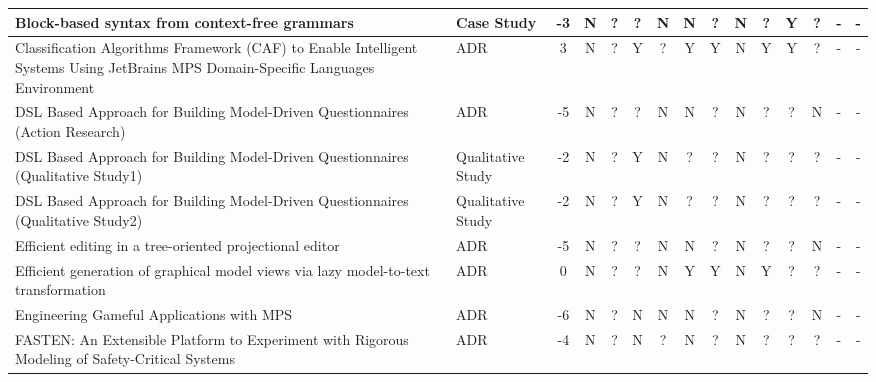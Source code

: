 \begin{landscape}
\begin{longtable}{ | p{11cm} | l | *{13}{c|} }
        Block-based syntax from context-free grammars\cite{addazi2021blended_SLR}                                                                                              & Case Study        &  -3   & N & ? & ? & N & N & ? & N & ? & Y & ?  & - & - \\\hline
        Classification Algorithms Framework (CAF) to Enable Intelligent Systems Using JetBrains MPS Domain-Specific Languages Environment\cite{meacham2020classification_SLR}  & ADR               &  3    & N & ? & Y & ? & Y & Y & N & Y & Y & ?  & - & - \\\hline
        DSL Based Approach for Building Model-Driven Questionnaires (Action Research)\cite{furtado2021dsl_SLR}                                                                 & ADR               &  -5   & N & ? & ? & N & N & ? & N & ? & ? & N  & - & - \\\hline
        DSL Based Approach for Building Model-Driven Questionnaires (Qualitative Study1)\cite{furtado2021dsl_SLR}                                                              & Qualitative Study &  -2   & N & ? & Y & N & ? & ? & N & ? & ? & ?  & - & - \\\hline
        DSL Based Approach for Building Model-Driven Questionnaires (Qualitative Study2)\cite{furtado2021dsl_SLR}                                                              & Qualitative Study &  -2   & N & ? & Y & N & ? & ? & N & ? & ? & ?  & - & - \\\hline
        Efficient editing in a tree-oriented projectional editor\cite{beckmann2020efficient_SLR}                                                                               & ADR               &  -5   & N & ? & ? & N & N & ? & N & ? & ? & N  & - & - \\\hline
        Efficient generation of graphical model views via lazy model-to-text transformation\cite{kolovos2020efficient_SLR}                                                     & ADR               &  0    & N & ? & ? & N & Y & Y & N & Y & ? & ?  & - & - \\\hline
        Engineering Gameful Applications with MPS\cite{bucchiarone2021engineering_SLR}                                                                                         & ADR               &  -6   & N & ? & N & N & N & ? & N & ? & ? & N  & - & - \\\hline
        FASTEN: An Extensible Platform to Experiment with Rigorous Modeling of Safety-Critical Systems\cite{ratiu2021fasten_SLR}                                               & ADR               &  -4   & N & ? & N & ? & N & ? & N & ? & ? & ?  & - & - \\\hline

\end{longtable}
\end{landscape}
